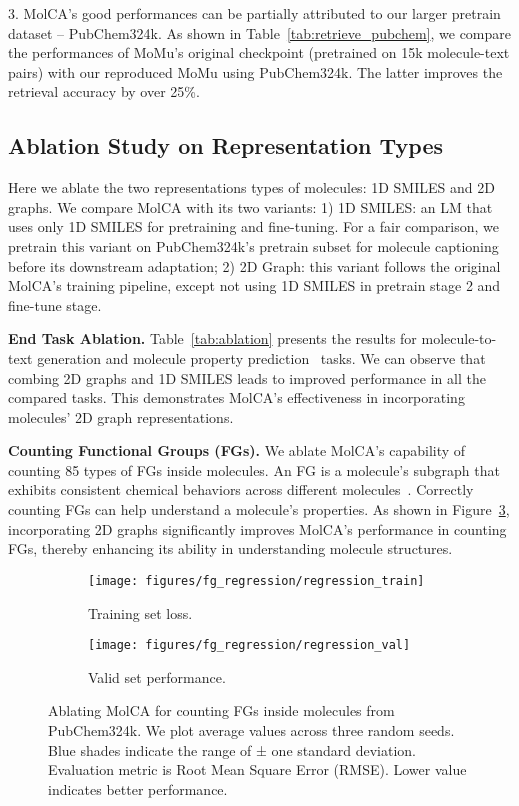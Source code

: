 \documentclass[11pt]{article}
\begin{document}
3. MolCA's good performances can be partially attributed to our larger pretrain dataset -- PubChem324k. As shown in Table~\ref{tab:retrieve_pubchem}, we compare the performances of MoMu's original checkpoint (pretrained on 15k molecule-text pairs) with our reproduced MoMu using PubChem324k. The latter improves the retrieval accuracy by over 25\%. 


\subsection{Ablation Study on Representation Types}
Here we ablate the two representations types of molecules: 1D SMILES and 2D graphs. We compare MolCA with its two variants: 1) 1D SMILES: an LM that uses only 1D SMILES for pretraining and fine-tuning. For a fair comparison, we pretrain this variant on PubChem324k's pretrain subset for molecule captioning before its downstream adaptation; 2) 2D Graph: this variant follows the original MolCA's training pipeline, except not using 1D SMILES in pretrain stage 2 and fine-tune stage. 

\textbf{End Task Ablation.} Table~\ref{tab:ablation} presents the results for molecule-to-text generation and molecule property prediction~\cite{pretrain_gnn} tasks. We can observe that combing 2D graphs and 1D SMILES leads to improved performance in all the compared tasks. This demonstrates MolCA's effectiveness in incorporating molecules' 2D graph representations.


\textbf{Counting Functional Groups (FGs).} We ablate MolCA's capability of counting 85 types of FGs inside molecules. An FG is a molecule's subgraph that exhibits consistent chemical behaviors across different molecules~\cite{Grover}. Correctly counting FGs can help understand a molecule's properties. As shown in Figure~\ref{fig:regression}, incorporating 2D graphs significantly improves MolCA's performance in counting FGs, thereby enhancing its ability in understanding molecule structures.




\begin{figure}[t]
\centering
\small
\begin{subfigure}[t]{0.235\textwidth}
\centering
\texttt{[image: figures/fg\_regression/regression\_train]}
\caption{Training set loss.}
\label{fig:regression_train}            
\end{subfigure}
\begin{subfigure}[t]{0.24\textwidth}
\centering
\texttt{[image: figures/fg\_regression/regression\_val]}
\caption{Valid set performance.}
\label{fig:regression_valid}            
\end{subfigure}
\caption{Ablating MolCA for counting FGs inside molecules from PubChem324k. We plot average values across three random seeds. Blue shades indicate the range of ± one standard deviation. 
Evaluation metric is Root Mean Square Error (RMSE). Lower value indicates better performance.}
 \vspace{-5mm}
\label{fig:regression}
\end{figure}
\end{document}
